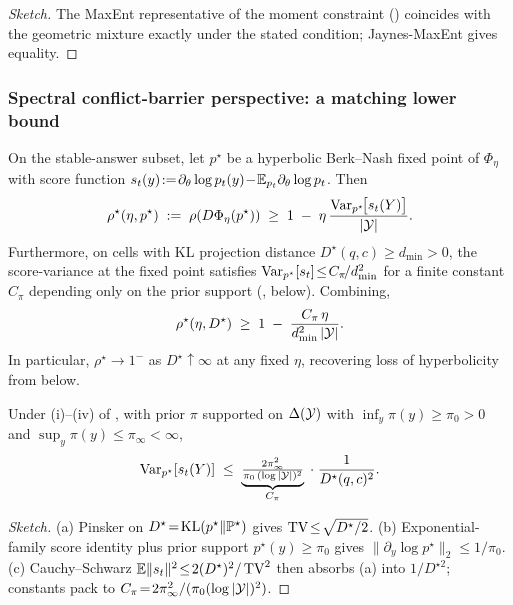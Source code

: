 \begin{proof}[Sketch]
The MaxEnt representative of the moment constraint
() coincides with the geometric mixture
exactly under the stated condition; Jaynes-MaxEnt gives equality.
\end{proof}

\subsubsection{Spectral conflict-barrier perspective: a matching lower bound}
\label{app:spectral-conflict-barrier}

\begin{theorem}
\label{thm:spectral-conflict-barrier}
On the stable-answer subset, let $p^\star$ be a hyperbolic
Berk--Nash fixed point of $\Phi_\eta$ with score function
$s_t(y)\!:=\!\partial_\theta\log p_t(y)\!-\!\mathbb{E}_{p_t}\partial_\theta\log p_t$.
Then
\[
\rho^\star(\eta,p^\star)
\;:=\;\rho(D\Phi_\eta(p^\star))
\;\ge\;
1\;-\;\eta\,\frac{\operatorname{Var}_{p^\star}\!\bigl[s_t(Y)\bigr]}{|\mathcal{Y}|}.
\]
Furthermore, on cells with KL projection distance
$D^\star(q,c)\!\ge\!d_{\min}\!>\!0$, the score-variance at the
fixed point satisfies
$\operatorname{Var}_{p^\star}[s_t]\!\le\!C_{\pi}\!/d_{\min}^{2}$ for a finite
constant $C_\pi$ depending only on the prior support
(, below).  Combining,
\[
\rho^\star(\eta,D^\star)\;\ge\;1\;-\;\frac{C_\pi\,\eta}{d_{\min}^{2}\,|\mathcal{Y}|}.
\]
In particular, $\rho^\star\!\to\!1^{-}$ as $D^\star\!\uparrow\!\infty$
at any fixed $\eta$, recovering loss of hyperbolicity from below.
\end{theorem}

\begin{lemma}
\label{lem:score-var-conflict}
Under (i)--(iv) of , with prior $\pi$ supported
on $\Delta(\mathcal{Y})$ with $\inf_y\pi(y)\!\ge\!\pi_0\!>\!0$ and
$\sup_y\pi(y)\!\le\!\pi_\infty\!<\!\infty$,
\[
\operatorname{Var}_{p^\star}[s_t(Y)]
\;\le\;
\underbrace{\tfrac{2\pi_\infty^{2}}{\pi_0\,(\log|\mathcal{Y}|)^{2}}}_{C_\pi}
\;\cdot\;\frac{1}{D^\star(q,c)^{2}}.
\]
\end{lemma}

\begin{proof}[Sketch]
(a) Pinsker on $D^\star\!=\!\operatorname{KL}(p^\star\|\mathbb{P}^\star)$ gives
$\operatorname{TV}\!\le\!\sqrt{D^\star/2}$.  (b) Exponential-family score
identity plus prior support $p^\star(y)\!\ge\!\pi_0$ gives
$\|\partial_y\log p^\star\|_2\!\le\!1/\pi_0$.  (c) Cauchy--Schwarz
$\mathbb{E}\|s_t\|^2\!\le\!2(D^\star)^2/\operatorname{TV}^2$ then absorbs (a) into
$1/D^{\star 2}$; constants pack to
$C_\pi\!=\!2\pi_\infty^2/(\pi_0(\log|\mathcal{Y}|)^2)$.
\end{proof}

